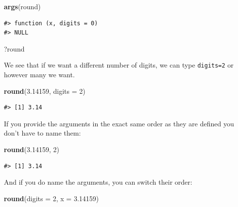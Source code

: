 \documentclass[]{book}
\newenvironment{Shaded}{\begin{snugshade}}{\end{snugshade}}
\newcommand{\KeywordTok}[1]{\textcolor[rgb]{0.13,0.29,0.53}{\textbf{#1}}}
\newcommand{\DataTypeTok}[1]{\textcolor[rgb]{0.13,0.29,0.53}{#1}}
\newcommand{\DecValTok}[1]{\textcolor[rgb]{0.00,0.00,0.81}{#1}}
\newcommand{\FloatTok}[1]{\textcolor[rgb]{0.00,0.00,0.81}{#1}}
\newcommand{\NormalTok}[1]{#1}
\begin{document}
\begin{Shaded}
\begin{Highlighting}[]
\KeywordTok{args}\NormalTok{(round)}
\end{Highlighting}
\end{Shaded}

\begin{verbatim}
#> function (x, digits = 0) 
#> NULL
\end{verbatim}

\begin{Shaded}
\begin{Highlighting}[]
\NormalTok{?round}
\end{Highlighting}
\end{Shaded}

We see that if we want a different number of digits, we can type
\texttt{digits=2} or however many we want.

\begin{Shaded}
\begin{Highlighting}[]
\KeywordTok{round}\NormalTok{(}\FloatTok{3.14159}\NormalTok{, }\DataTypeTok{digits =} \DecValTok{2}\NormalTok{)}
\end{Highlighting}
\end{Shaded}

\begin{verbatim}
#> [1] 3.14
\end{verbatim}

If you provide the arguments in the exact same order as they are defined
you don't have to name them:

\begin{Shaded}
\begin{Highlighting}[]
\KeywordTok{round}\NormalTok{(}\FloatTok{3.14159}\NormalTok{, }\DecValTok{2}\NormalTok{)}
\end{Highlighting}
\end{Shaded}

\begin{verbatim}
#> [1] 3.14
\end{verbatim}

And if you do name the arguments, you can switch their order:

\begin{Shaded}
\begin{Highlighting}[]
\KeywordTok{round}\NormalTok{(}\DataTypeTok{digits =} \DecValTok{2}\NormalTok{, }\DataTypeTok{x =} \FloatTok{3.14159}\NormalTok{)}
\end{Highlighting}
\end{Shaded}
\end{document}
